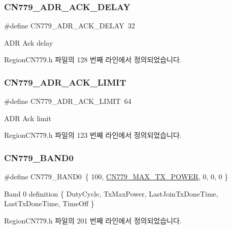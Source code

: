 \subsubsection{\texorpdfstring{C\+N779\+\_\+\+A\+D\+R\+\_\+\+A\+C\+K\+\_\+\+D\+E\+L\+AY}{CN779\_ADR\_ACK\_DELAY}}
{\footnotesize\ttfamily \#define C\+N779\+\_\+\+A\+D\+R\+\_\+\+A\+C\+K\+\_\+\+D\+E\+L\+AY~32}

A\+DR Ack delay 

Region\+C\+N779.\+h 파일의 128 번째 라인에서 정의되었습니다.

\mbox{\label{group___r_e_g_i_o_n_c_n779_ga8c19c4c4ef1a00d6865607b7d61f0325}} 
\subsubsection{\texorpdfstring{C\+N779\+\_\+\+A\+D\+R\+\_\+\+A\+C\+K\+\_\+\+L\+I\+M\+IT}{CN779\_ADR\_ACK\_LIMIT}}
{\footnotesize\ttfamily \#define C\+N779\+\_\+\+A\+D\+R\+\_\+\+A\+C\+K\+\_\+\+L\+I\+M\+IT~64}

A\+DR Ack limit 

Region\+C\+N779.\+h 파일의 123 번째 라인에서 정의되었습니다.

\mbox{\label{group___r_e_g_i_o_n_c_n779_ga428819be1d6f97028be344a4bf8dff3e}} 
\subsubsection{\texorpdfstring{C\+N779\+\_\+\+B\+A\+N\+D0}{CN779\_BAND0}}
{\footnotesize\ttfamily \#define C\+N779\+\_\+\+B\+A\+N\+D0~\{ 100, \mbox{\hyperlink{group___r_e_g_i_o_n_c_n779_ga8a70356561f3416db21a1e93b4ee4ae9}{C\+N779\+\_\+\+M\+A\+X\+\_\+\+T\+X\+\_\+\+P\+O\+W\+ER}}, 0, 0, 0 \}}

Band 0 definition \{ Duty\+Cycle, Tx\+Max\+Power, Last\+Join\+Tx\+Done\+Time, Last\+Tx\+Done\+Time, Time\+Off \} 

Region\+C\+N779.\+h 파일의 201 번째 라인에서 정의되었습니다.

